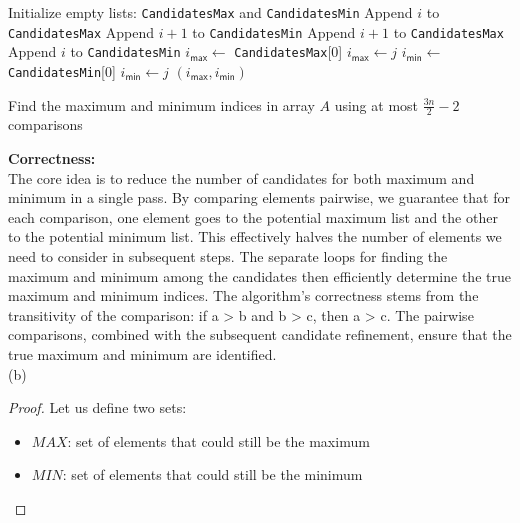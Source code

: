 \documentclass[letterpaper, 11pt]{article}
\newcommand{\1}{\mathds{1}}	%
\theoremstyle{definition}
\newenvironment{solution}{{\par\noindent\it Solution.}}{}
\begin{document}
\begin{solution}
    \begin{algorithm}[H]
        \begin{algorithmic}[1]
            \STATE Initialize empty lists: \texttt{CandidatesMax} and \texttt{CandidatesMin}
                    \STATE Append $i$ to \texttt{CandidatesMax}
                    \STATE Append $i+1$ to \texttt{CandidatesMin}
                \ELSE
                    \STATE Append $i+1$ to \texttt{CandidatesMax}
                    \STATE Append $i$ to \texttt{CandidatesMin}
                \ENDIF
            \ENDFOR
            \STATE $i_\mathsf{max} \gets$ \texttt{CandidatesMax}[0]
                    \STATE $i_\mathsf{max} \gets j$
                \ENDIF
            \ENDFOR
            \STATE $i_\mathsf{min} \gets$ \texttt{CandidatesMin}[0]
                    \STATE $i_\mathsf{min} \gets j$
                \ENDIF
            \ENDFOR
            \ENSURE $(i_\mathsf{max}, i_\mathsf{min})$
        \end{algorithmic}
        \caption{Find the maximum and minimum indices in array $A$ using at most $\frac{3n}{2} - 2$ comparisons}
        \end{algorithm}
        \textbf{Correctness:}
        \\The core idea is to reduce the number of candidates for both maximum and minimum in a single pass. By comparing elements pairwise, we guarantee that for each comparison, one element goes to the potential maximum list and the other to the potential minimum list. This effectively halves the number of elements we need to consider in subsequent steps. The separate loops for finding the maximum and minimum among the candidates then efficiently determine the true maximum and minimum indices. The algorithm's correctness stems from the transitivity of the comparison: if a > b and b > c, then a > c. The pairwise comparisons, combined with the subsequent candidate refinement, ensure that the true maximum and minimum are identified.
      \\ (b) \begin{proof}
            Let us define two sets:
\begin{itemize}
    \item $MAX$: set of elements that could still be the maximum
    \item $MIN$: set of elements that could still be the minimum
\end{itemize}


\end{proof}
\end{solution}
\end{document}
